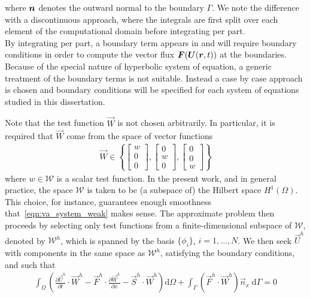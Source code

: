 where $\boldsymbol n$ denotes the outward normal to the boundary $\Gamma$. We note the difference with a discontinuous approach, where the integrals are first split over each element of the computational domain before integrating per part. \\
By integrating per part, a boundary term appears in  and will require boundary conditions in order to compute the vector flux $\boldsymbol F(\boldsymbol U(\boldsymbol r, t))$ at the boundaries. Because of the special nature of hyperbolic system of equation, a generic treatment of the boundary terms is not suitable. Instead a case by case approach is chosen and boundary conditions will be specified for each system of equations studied in this dissertation. 

Note that the test function $\vec{W}$ is not chosen arbitrarily.
In particular, it is required that $\vec{W}$ come from the space of
vector functions
\begin{align}
  \label{eqn:W_set}
  \vec{W} \in \left\{
      \begin{bmatrix}
        w \\ 0 \\ 0
      \end{bmatrix},
      \begin{bmatrix}
        0 \\ w \\ 0
      \end{bmatrix},
      \begin{bmatrix}
        0 \\ 0 \\ w
      \end{bmatrix}
    \right\}
\end{align}
where $w \in \mathcal{W}$ is a scalar test function.  In the present
work, and in general practice, the space $\mathcal{W}$ is taken to be
(a subspace of) the Hilbert space $H^1(\Omega)$. This choice, for
instance, guarantees enough smoothness that~\eqref{eqn:va_system_weak}
makes sense.
%
The approximate problem then proceeds by selecting only test functions
from a finite-dimensional subspace of $\mathcal{W}$, denoted by
$\mathcal{W}^h$, which is spanned by the basis $\{\phi_i\}$,
$i=1,\ldots,N$.  We then seek $\vec{U}^h$ with components in the same
space as $\mathcal{W}^h$, satisfying the boundary conditions, and such
that
\begin{align}
  \label{eqn:va_system_weak_h}
  \int_{\Omega} \left(\frac{\partial \vec{U}^h}{\partial t} \cdot \vec{W}^h
    - \vec{F}^h\cdot \frac{\partial \vec{W}^h}{\partial x} - \vec{S}^h\cdot\vec{W}^h \right) \text{d}\Omega
  + \int_{\Gamma} \left( \vec{F}^h \cdot \vec{W}^h \right) \vec{n}_x \;\text{d}\Gamma = 0
\end{align}
